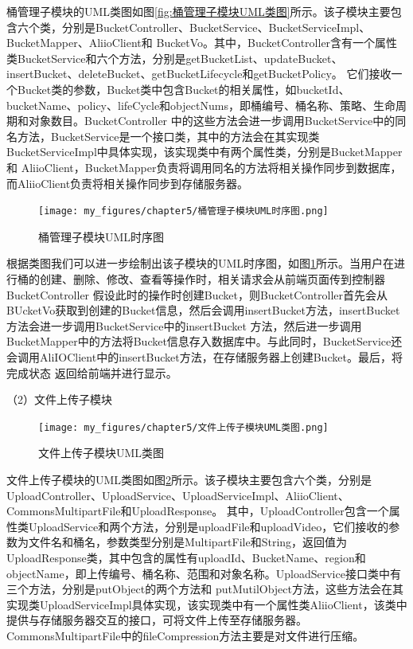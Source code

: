 桶管理子模块的UML类图如图\ref{fig:桶管理子模块UML类图}所示。该子模块主要包含六个类，分别是BucketController、BucketService、BucketServiceImpl、BucketMapper、AliioClient和
BucketVo。其中，BucketController含有一个属性类BucketService和六个方法，分别是getBucketList、updateBucket、insertBucket、deleteBucket、getBucketLifecycle和getBucketPolicy。
它们接收一个Bucket类的参数，Bucket类中包含Bucket的相关属性，如bucketId、bucketName、policy、lifeCycle和objectNums，即桶编号、桶名称、策略、生命周期和对象数目。BucketController
中的这些方法会进一步调用BucketService中的同名方法，BucketService是一个接口类，其中的方法会在其实现类BucketServiceImpl中具体实现，该实现类中有两个属性类，分别是BucketMapper和
AliioClient，BucketMapper负责将调用同名的方法将相关操作同步到数据库，而AliioClient负责将相关操作同步到存储服务器。

\begin{figure}[htb]
    \centering
    \texttt{[image: my\_figures/chapter5/桶管理子模块UML时序图.png]}
    \caption{桶管理子模块UML时序图}
    \label{fig:桶管理子模块UML时序图}
\end{figure}


根据类图我们可以进一步绘制出该子模块的UML时序图，如图\ref{fig:桶管理子模块UML时序图}所示。当用户在进行桶的创建、删除、修改、查看等操作时，相关请求会从前端页面传到控制器BucketController
假设此时的操作时创建Bucket，则BucketController首先会从BUcketVo获取到创建的Bucket信息，然后会调用insertBucket方法，insertBucket方法会进一步调用BucketService中的insertBucket
方法，然后进一步调用BucketMapper中的方法将Bucket信息存入数据库中。与此同时，BucketService还会调用AliIOClient中的insertBucket方法，在存储服务器上创建Bucket。最后，将完成状态
返回给前端并进行显示。

（2）文件上传子模块

\begin{figure}[htb]
    \centering
    \texttt{[image: my\_figures/chapter5/文件上传子模块UML类图.png]}
    \caption{文件上传子模块UML类图}
    \label{fig:文件上传子模块UML类图}
\end{figure}

文件上传子模块的UML类图如图\ref{fig:文件上传子模块UML类图}所示。该子模块主要包含六个类，分别是UploadController、UploadService、UploadServiceImpl、AliioClient、CommonsMultipartFile和UploadResponse。
其中，UploadController包含一个属性类UploadService和两个方法，分别是uploadFile和uploadVideo，它们接收的参数为文件名和桶名，参数类型分别是MultipartFile和String，返回值为
UploadResponse类，其中包含的属性有uploadId、BucketName、region和objectName，即上传编号、桶名称、范围和对象名称。UploadService接口类中有三个方法，分别是putObject的两个方法和
putMutilObject方法，这些方法会在其实现类UploadServiceImpl具体实现，该实现类中有一个属性类AliioClient，该类中提供与存储服务器交互的接口，可将文件上传至存储服务器。
CommonsMultipartFile中的fileCompression方法主要是对文件进行压缩。

